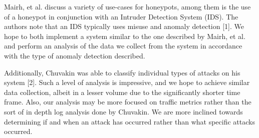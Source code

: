 %
Mairh, et al. discuss a variety of use-cases for honeypots, among them is the use of a honeypot in conjunction with an Intruder Detection System (IDS). The authors note that an IDS typically uses misuse and anomaly detection [1]. We hope to both implement a system similar to the one described by Mairh, et al. and perform an analysis of the data we collect from the system in accordance with the type of anomaly detection described.

Additionally, Chuvakin was able to classify individual types of attacks on his system [2]. Such a level of analysis is impressive, and we hope to achieve similar data collection, albeit in a lesser volume due to the significantly shorter time frame. Also, our analysis may be more focused on traffic metrics rather than the sort of in depth log analysis done by Chuvakin. We are more inclined towards determining if and when an attack has occurred rather than what specific attacks occurred.